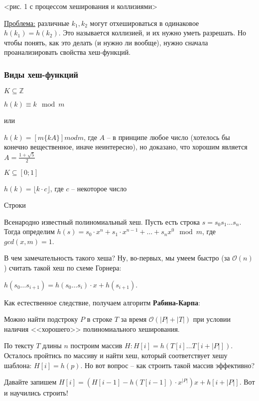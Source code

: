 \documentclass[fleqn, 12pt]{article}
\newcommand{\lr}[1]{\left({#1}\right)}
\newcommand{\bigo}{\mathcal{O}}
\newcommand{\mb}[1]{\mathbb{#1}}
\newenvironment{myindentpar}[1]%
{\begin{list}{}%
		{\setlength{\leftmargin}{#1}}%
		\item[]
	}
	{\end{list}}
\begin{document}
<рис. 1 с процессом хеширования и коллизиями>

\underline{Проблема:} различные $ k_1, k_2 $ могут отхешироваться в одинаковое $ h(k_1) = h(k_2) $. Это называется коллизией, и их нужно уметь разрешать. Но чтобы понять, как это делать (и нужно ли вообще), нужно сначала проанализировать свойства хеш-функций.

\subsubsection{Виды хеш-функций}

\begin{enumerate}
	\item $ K \subseteq \mb{Z} $
	
	$ h(k) \equiv k \mod m $
	
	или
	
	$ h(k) = [m \{ kA \}] mod m $, где $ A $ -- в принципе любое число (хотелось бы конечно вещественное, иначе неинтересно), но доказано, что хорошим является $ A = \frac{1 + \sqrt{5}}{2} $
	
	\item $ K \subseteq [0; 1] $
	
	$ h(k) =  \lfloor k \cdot c \rfloor $, где $ c $ -- некоторое число
	
	\item Строки
	
	Всенародно известный полиномиальный хеш. Пусть есть строка $ s = s_0 s_1 \ldots s_n $. Тогда определим $ h(s) = s_0 \cdot x^n + s_1 \cdot x^{n - 1} + \ldots + s_n x^0 \mod m $, где $ gcd(x, m) = 1 $. 
	
	В чем замечательность такого хеша? Ну, во-первых, мы умеем быстро (за $ \bigo(n) $ ) считать такой хеш по схеме Горнера:
	
	$ h(s_0 \ldots s_{i + 1}) = h (s_0 \ldots s_i) \cdot x + h(s_{i + 1}) $.
	
	Как естественное следствие, получаем алгоритм \textbf{Рабина-Карпа}:
	
	\begin{myindentpar}{0.5cm}
		Можно найти подстроку $ P $ в строке $ T $ за время $ \bigo( |P| + |T| ) $ при условии наличия <<хорошего>> полиномиального хеширования. 
		
		По тексту $ T $ длины $ n $ построим массив $ H \colon H[i] = h(T[i] \ldots T[i + |P|]) $. Осталось пройтись по массиву и найти хеш, который соответствует хешу шаблона: $ H[i] = h(p) $. Но вот вопрос -- как строить такой массив эффективно?
		
		Давайте запишем $ H[i] = \lr{H[i - 1] - h(T[i - 1]) \cdot x^{|P|} }x + h[i + |P|] $. Вот и научились строить!
	\end{myindentpar}
	
\end{enumerate}
\end{document}
